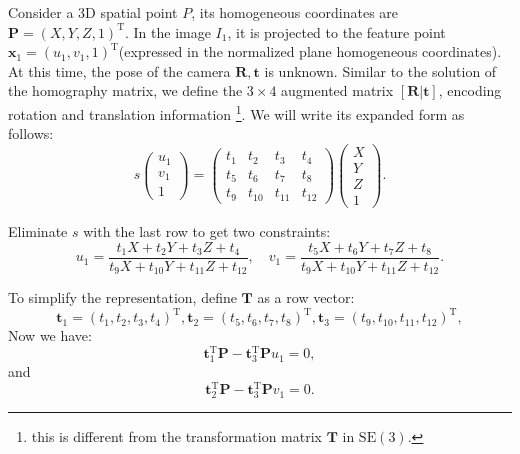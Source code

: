 Consider a 3D spatial point $P$, its homogeneous coordinates are ${\mathbf{P}}=(X,Y,Z,1)^{\mathrm{T}}$. In the image $I_{1}$, it is projected to the feature point ${\mathbf{x}}_{1}=(u_{1},v_{1},1)^{\mathrm{T}}$(expressed in the normalized plane homogeneous coordinates). At this time, the pose of the camera $\mathbf{R}, \mathbf{t}$ is unknown. Similar to the solution of the homography matrix, we define the $3\times 4$ augmented matrix $[\mathbf{R}|\mathbf{t}]$, encoding rotation and translation information \footnote{this is different from the transformation matrix $\mathbf{T}$ in $\mathrm{SE}(3)$. }. We will write its expanded form as follows:
\begin{equation}
s
\begin{pmatrix}
u_{1} \\ v_{1} \\ 1
\end{pmatrix}
=
\begin{pmatrix}
t_{1} & t_{2} & t_{3} & t_{4}\\ 
t_{5} & t_{6} & t_{7} & t_{8}\\ 
t_{9} & t_{10} & t_{11} & t_{12}
\end{pmatrix}
\begin{pmatrix}
X \\ Y \\ Z \\ 1
\end{pmatrix}.
\end{equation}

Eliminate $s$ with the last row to get two constraints:
\[
u_{1}=\frac{t_{1}X+t_{2}Y+t_{3}Z+t_{4}}{t_{9}X+t_{10}Y+t_{11}Z+t_{12}},\quad
v_{1}=\frac{t_{5}X+t_{6}Y+t_{7}Z+t_{8}}{t_{9}X+t_{10}Y+t_{11}Z+t_{12}}.
\]

To simplify the representation, define $\mathbf{T}$ as a row vector:
\[
\mathbf{t}_{1}=(t_{1},t_{2},t_{3},t_{4})^\mathrm{T},
\mathbf{t}_{2}=(t_{5},t_{6},t_{7},t_{8})^\mathrm{T},
\mathbf{t}_{3}=(t_{9},t_{10},t_{11},t_{12})^\mathrm{T},
\]
Now we have:
\[
\mathbf{t}_1^\mathrm{T}\mathbf{P}-\mathbf{t}_3^\mathrm{T}\mathbf{P} u_1=0,
\]
and
\[
\mathbf{t}_2^\mathrm{T}\mathbf{P}-\mathbf{t}_3^\mathrm{T}\mathbf{P} v_1=0.
\]

